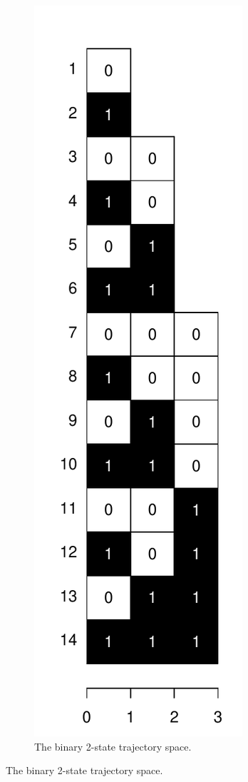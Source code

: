 \documentclass[a4paper]{article}
\begin{document}
\begin{figure}
    \centering
    \begin{subfigure}[b]{0.4\textwidth}
        \includegraphics[scale=.5]{Figures/BernTraj.pdf}
        \caption{The binary 2-state trajectory space.}

\end{subfigure}
\end{figure}
\end{document}
